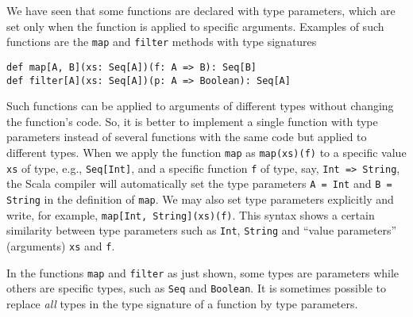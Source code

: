 We have seen that some functions are declared with type parameters,
which are set only when the function is applied to specific arguments.
Examples of such functions are the \lstinline!map!
and \lstinline!filter!
methods with type signatures
\begin{lstlisting}
def map[A, B](xs: Seq[A])(f: A => B): Seq[B]
def filter[A](xs: Seq[A])(p: A => Boolean): Seq[A]
\end{lstlisting}
Such functions can be applied to arguments of different types without
changing the function's code. So, it is better to implement a single
function with type parameters instead of several functions with the
same code but applied to different types. When we apply the function
\lstinline!map! as \lstinline!map(xs)(f)!
to a specific value \lstinline!xs!
of type, e.g., \lstinline!Seq[Int]!,
and a specific function \lstinline!f!
of type, say, \lstinline!Int => String!,
the Scala compiler will automatically set the type parameters \lstinline!A = Int!
and \lstinline!B = String!
in the definition of \lstinline!map!.
We may also set type parameters explicitly and write, for example,
\lstinline!map[Int, String](xs)(f)!.
This syntax shows a certain similarity between type parameters such
as \lstinline!Int!, \lstinline!String!
and ``value parameters'' (arguments) \lstinline!xs!
and \lstinline!f!.

In the functions \lstinline!map!
and \lstinline!filter!
as just shown, some types are parameters while others are specific
types, such as \lstinline!Seq!
and \lstinline!Boolean!.
It is sometimes possible to replace \emph{all} types in the type signature
of a function by type parameters.

